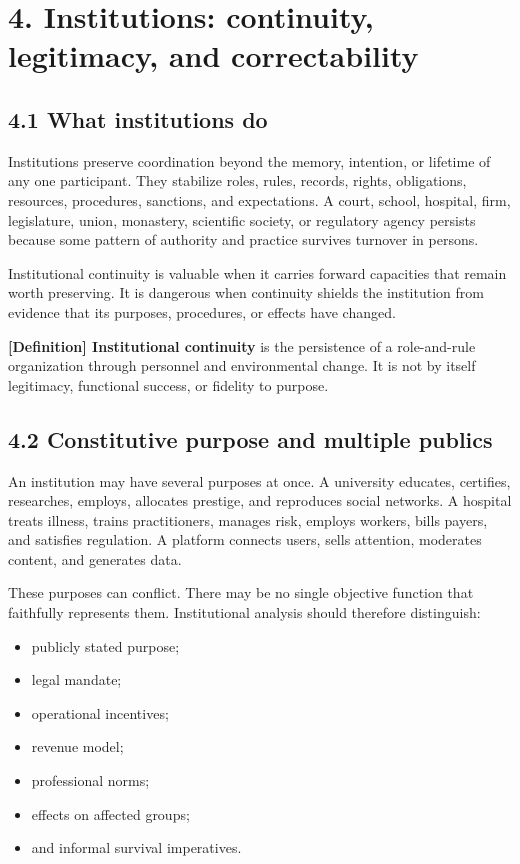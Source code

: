 \documentclass[
  11pt,
]{article}
\providecommand{\tightlist}{%
  \setlength{\itemsep}{0pt}\setlength{\parskip}{0pt}}
\begin{document}
\section{4. Institutions: continuity, legitimacy, and
correctability}\label{institutions-continuity-legitimacy-and-correctability}

\subsection{4.1 What institutions do}\label{what-institutions-do}

Institutions preserve coordination beyond the memory, intention, or
lifetime of any one participant. They stabilize roles, rules, records,
rights, obligations, resources, procedures, sanctions, and expectations.
A court, school, hospital, firm, legislature, union, monastery,
scientific society, or regulatory agency persists because some pattern
of authority and practice survives turnover in persons.

Institutional continuity is valuable when it carries forward capacities
that remain worth preserving. It is dangerous when continuity shields
the institution from evidence that its purposes, procedures, or effects
have changed.

\textbf{{[}Definition{]} Institutional continuity} is the persistence of
a role-and-rule organization through personnel and environmental change.
It is not by itself legitimacy, functional success, or fidelity to
purpose.

\subsection{4.2 Constitutive purpose and multiple
publics}\label{constitutive-purpose-and-multiple-publics}

An institution may have several purposes at once. A university educates,
certifies, researches, employs, allocates prestige, and reproduces
social networks. A hospital treats illness, trains practitioners,
manages risk, employs workers, bills payers, and satisfies regulation. A
platform connects users, sells attention, moderates content, and
generates data.

These purposes can conflict. There may be no single objective function
that faithfully represents them. Institutional analysis should therefore
distinguish:

\begin{itemize}
\tightlist
\item
  publicly stated purpose;
\item
  legal mandate;
\item
  operational incentives;
\item
  revenue model;
\item
  professional norms;
\item
  effects on affected groups;
\item
  and informal survival imperatives.
\end{itemize}
\end{document}
